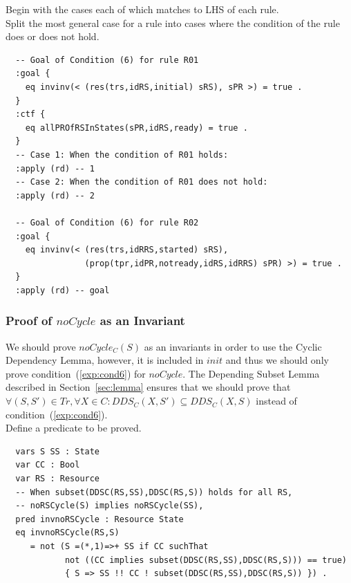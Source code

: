 \documentclass[12pt]{report}
\begin{document}
\vspace{0.3cm}
 Begin with the cases each of which matches to
LHS of each rule. \\ 
 Split the most general case for a rule into
cases where the condition of the rule does or does not hold. 
\small
\begin{verbatim}
  -- Goal of Condition (6) for rule R01
  :goal {
    eq invinv(< (res(trs,idRS,initial) sRS), sPR >) = true .
  }
  :ctf {
    eq allPROfRSInStates(sPR,idRS,ready) = true .
  }
  -- Case 1: When the condition of R01 holds:
  :apply (rd) -- 1
  -- Case 2: When the condition of R01 does not hold:
  :apply (rd) -- 2

  -- Goal of Condition (6) for rule R02
  :goal {
    eq invinv(< (res(trs,idRRS,started) sRS),
                (prop(tpr,idPR,notready,idRS,idRRS) sPR) >) = true .
  }
  :apply (rd) -- goal
\end{verbatim}
\normalsize

\subsubsection*{Proof of $noCycle$ as an Invariant}
We should prove $noCycle_C(S)$ as an invariants in order to use the
Cyclic Dependency Lemma, however, it is included in $init$ and thus we
should only prove condition~(\ref{exp:cond6}) for $noCycle$.  The
Depending Subset Lemma described in Section~\ref{sec:lemma} ensures
that we should prove that $\forall (S,S') \in Tr, \forall X\in
C:DDS_C(X,S')\subseteq DDS_C(X,S)$ instead of
condition~(\ref{exp:cond6}).\\

 Define a predicate to be proved. 
\small
\begin{verbatim}
  vars S SS : State
  var CC : Bool
  var RS : Resource
  -- When subset(DDSC(RS,SS),DDSC(RS,S)) holds for all RS,
  -- noRSCycle(S) implies noRSCycle(SS),
  pred invnoRSCycle : Resource State
  eq invnoRSCycle(RS,S) 
     = not (S =(*,1)=>+ SS if CC suchThat
            not ((CC implies subset(DDSC(RS,SS),DDSC(RS,S))) == true)
            { S => SS !! CC ! subset(DDSC(RS,SS),DDSC(RS,S)) }) .
\end{verbatim}
\normalsize
\end{document}

